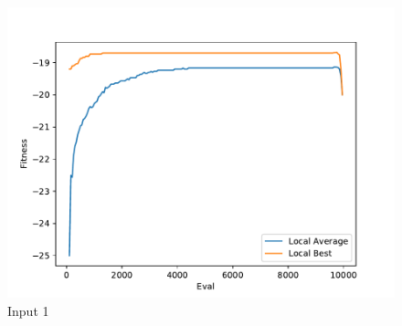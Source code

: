 \documentclass{standalone}
\begin{document}
\begin{figure}[!htb]
	\caption{Input 1}
	\label{fig:graph_1032}
	\includegraphics[width=\textwidth]{../graphs/graphs/1032.pdf}
\end{figure}
\end{document}
